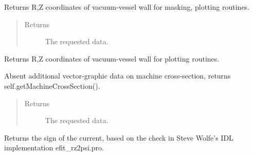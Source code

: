 \documentclass[letterpaper,10pt,english]{sphinxmanual}
\begin{document}
\begin{fulllineitems}
\begin{fulllineitems}
\end{fulllineitems}


\begin{fulllineitems}
\label{eqtools:eqtools.EFIT.EFITTree.getMachineCrossSection}
Returns R,Z coordinates of vacuum-vessel wall for masking, plotting routines.
\begin{quote}\begin{description}
\item[{Returns}] \leavevmode
The requested data.

\end{description}\end{quote}

\end{fulllineitems}


\begin{fulllineitems}
\label{eqtools:eqtools.EFIT.EFITTree.getMachineCrossSectionFull}
Returns R,Z coordinates of vacuum-vessel wall for plotting routines.

Absent additional vector-graphic data on machine cross-section, returns
self.getMachineCrossSection().
\begin{quote}\begin{description}
\item[{Returns}] \leavevmode
The requested data.

\end{description}\end{quote}

\end{fulllineitems}


\begin{fulllineitems}
\label{eqtools:eqtools.EFIT.EFITTree.getCurrentSign}
Returns the sign of the current, based on the check in Steve Wolfe's IDL implementation efit\_rz2psi.pro.

\end{fulllineitems}



\end{fulllineitems}
\end{document}
